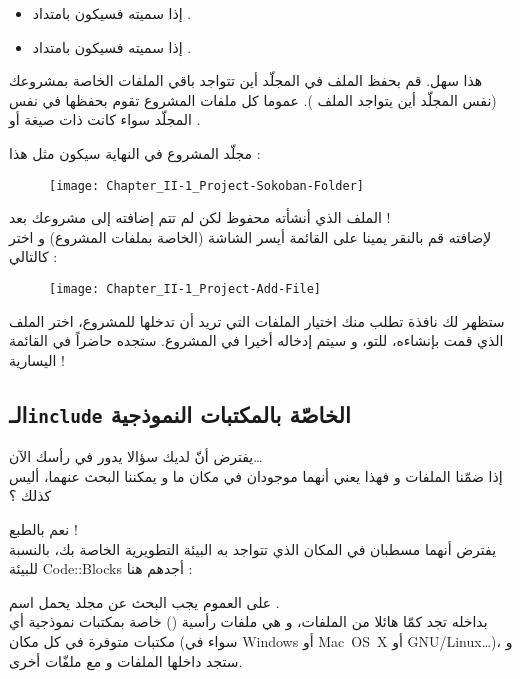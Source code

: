 \begin{itemize}
  \item إذا سميته
فسيكون بامتداد
.
  \item إذا سميته
فسيكون بامتداد
.
\end{itemize}

هذا سهل. قم بحفظ الملف في المجلّد أين تتواجد باقي الملفات الخاصة بمشروعك (نفس المجلّد أين يتواجد الملف
). عموما كل ملفات المشروع تقوم بحفظها في نفس المجلّد سواء كانت ذات صيغة
أو
.

مجلّد المشروع في النهاية سيكون مثل هذا :

\begin{figure}[H]
	\centering
	\texttt{[image: Chapter\_II-1\_Project-Sokoban-Folder]}
\end{figure}

الملف الذي أنشأته محفوظ لكن لم تتم إضافته إلى مشروعك بعد !\\
لإضافته قم بالنقر يمينا على القائمة أيسر الشاشة (الخاصة بملفات المشروع) و اختر
كالتالي :

\begin{figure}[H]
	\centering
	\texttt{[image: Chapter\_II-1\_Project-Add-File]}
\end{figure}

ستظهر لك نافذة تطلب منك اختيار الملفات التي تريد أن تدخلها للمشروع، اختر الملف الذي قمت بإنشاءه، للتو، و سيتم إدخاله أخيرا في المشروع.  ستجده حاضراً في القائمة اليسارية !

\subsection{الـ\texttt{include} الخاصّة بالمكتبات النموذجية}

يفترض أنّ لديك سؤالا يدور في رأسك الآن\dots\\
إذا ضمّنا الملفات
و
فهذا يعني أنهما موجودان في مكان ما و يمكننا البحث عنهما، أليس كذلك ؟

نعم بالطبع !\\
يفترض أنهما مسطبان في المكان الذي تتواجد به البيئة التطويرية الخاصة بك، بالنسبة للبيئة
\textenglish{Code::Blocks}
أجدهم هنا :


على العموم يجب البحث عن مجلد يحمل اسم
.\\
بداخله تجد كمّا هائلا من الملفات، و هي ملفات رأسية
()
خاصة بمكتبات نموذجية أي مكتبات متوفرة في كل مكان (سواء في 
\textenglish{Windows}
أو
\textenglish{\mbox{Mac OS X}}
أو 
\textenglish{\mbox{GNU/Linux}}\dots)،
و ستجد داخلها الملفات
و
مع ملفّات أخرى.


